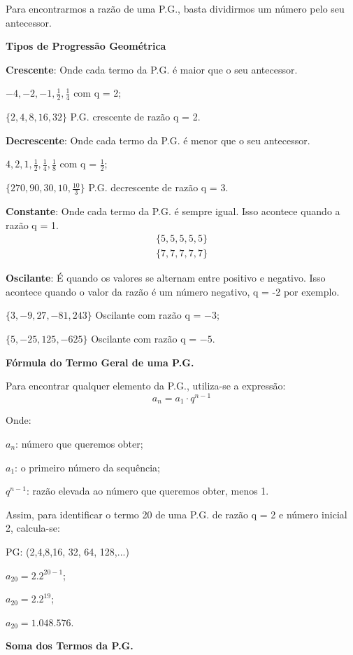 \begin{multicols*}{2}
	Para encontrarmos a razão de uma P.G., basta dividirmos um número pelo seu antecessor.

	\textbf{Tipos de Progressão Geométrica}

	\textbf{Crescente}: Onde cada termo da P.G. é maior que o seu antecessor.

		{$ -4, -2, -1, \frac{1}{2}, \frac{1}{4} $ com q = 2};

	{$ \{ 2, 4, 8, 16, 32 \} $} P.G. crescente de razão q = 2.

	\textbf{Decrescente}: Onde cada termo da P.G. é menor que o seu antecessor.

		{$ 4, 2, 1, \frac{1}{2}, \frac{1}{4}, \frac{1}{8} $ com q = $\frac{1}{2}$};

	{$ \{ 270, 90, 30, 10, \frac{10}{3}\} $} P.G. decrescente de razão q = 3.

	\textbf{Constante}: Onde cada termo da P.G. é sempre igual. Isso acontece quando a razão q = 1.
	\begin{align*}
		\{ 5, 5, 5, 5, 5 \}\\
		\{ 7, 7, 7, 7,7 \}
	\end{align*}

	\textbf{Oscilante}: É quando os valores se alternam entre positivo e negativo. Isso acontece quando o valor da razão é um número negativo, q = -2 por exemplo.

		{$ \{ 3, -9, 27, -81, 243 \}$} Oscilante com razão q = $-3$;

	{$ \{ 5, -25, 125, -625 \}$} Oscilante com razão q = $-5$.

	\textbf{Fórmula do Termo Geral de uma P.G.}

	Para encontrar qualquer elemento da P.G., utiliza-se a expressão:
	\[ a_n = a_1 \cdot q^{n -1} \]

	Onde:

	$a_n$: número que queremos obter;

	$a_1$: o primeiro número da sequência;

	$q^{n-1}$: razão elevada ao número que queremos obter, menos 1.

	Assim, para identificar o termo 20 de uma P.G. de razão q = 2 e número inicial 2, calcula-se:

	{PG: (2,4,8,16, 32, 64, 128,...)}

	{$ a_20 = 2 . 2^{20-1} $};

	{$ a_20 = 2 . 2^{19} $};

	{$ a_20 = 1.048.576 $}.

	\textbf{Soma dos Termos da P.G.}


\end{multicols*}
